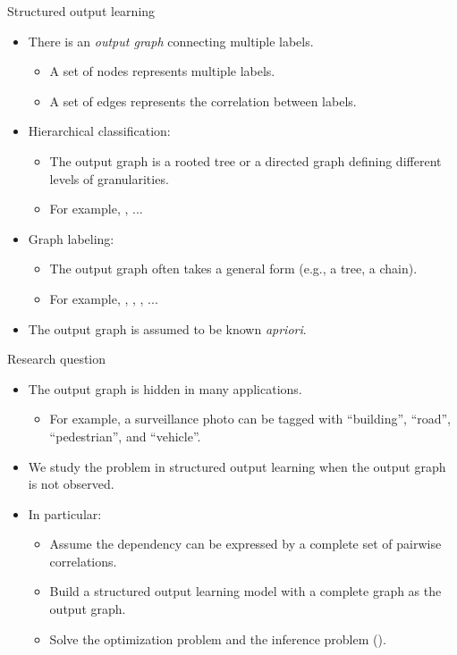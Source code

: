 \documentclass[first=dgreen,second=purple,logo=yellowexc]{aaltoslides}
\begin{document}
%
\begin{frame}{Structured output learning}
	\begin{itemize}\footnotesize
		\item There is an \textit{output graph} connecting multiple labels.
		\begin{itemize}\footnotesize
			\item A set of nodes represents multiple labels.
			\item A set of edges represents the correlation between labels.
		\end{itemize}
		\item Hierarchical classification:
		\begin{itemize}\footnotesize
			\item The output graph is a rooted tree or a directed graph defining different levels of granularities.
			\item For example, \svmstruct, ...
		\end{itemize}
		\item Graph labeling:
		\begin{itemize}\footnotesize
			\item The output graph often takes a general form (e.g., a tree, a chain).
			\item For example, \mmmn, \crf, \mmcrf, ...
		\end{itemize}
		\item The output graph is assumed to be known \textit{apriori}.
	\end{itemize}
\end{frame}



%
\begin{frame}{Research question}
	\begin{itemize}\footnotesize
		\item The output graph is hidden in many applications.
		\begin{itemize}\footnotesize
			\item For example, a surveillance photo can be tagged with ``building'', ``road'', ``pedestrian'', and ``vehicle''.
		\end{itemize}
		\item We study the problem in structured output learning when the output graph is not observed.
		\item In particular:
		\begin{itemize}\footnotesize
			\item Assume the dependency can be expressed by a complete set of pairwise correlations.
			\item Build a structured output learning model with a complete graph as the output graph.
			\item Solve the optimization problem and the inference problem (\nphard).
		\end{itemize}
	\end{itemize}
\end{frame}
\end{document}

